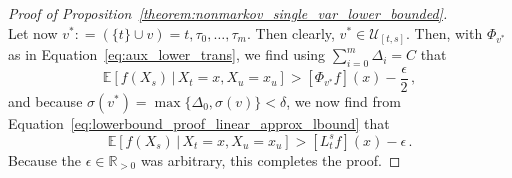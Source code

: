 \documentclass[10pt,a4paper]{paper}
\theoremstyle{definition}
\newcommand{\reals}{\mathbb{R}}
\newcommand{\realspos}{\reals_{>0}}
\newcommand{\coloneqq}{:\!=}
\begin{document}
\begin{proof}[Proof of Proposition~\ref{theorem:nonmarkov_single_var_lower_bounded}]
\begin{equation*}
\end{equation*}
Let now $v^*\coloneqq (\{t\}\cup v)=t,\tau_0,\ldots,\tau_m$. Then clearly, $v^*\in\mathcal{U}_{[t,s]}$. Then, with $\Phi_{v^*}$ as in Equation~\eqref{eq:aux_lower_trans}, we find using $\sum_{i=0}^m\Delta_i=C$ that
\begin{equation*}
\mathbb{E}[f(X_s)\,\vert\,X_t=x,X_u=x_u] > \left[\Phi_{v^*}f\right](x) - \frac{\epsilon}{2}\,,
\end{equation*}
and because $\sigma(v^*)=\max\{\Delta_0,\sigma(v)\}<\delta$, we now find from Equation~\eqref{eq:lowerbound_proof_linear_approx_lbound} that
\begin{equation*}
\mathbb{E}[f(X_s)\,\vert\,X_t=x,X_u=x_u] > \left[L_{t}^sf\right](x) - \epsilon\,.
\end{equation*}
Because the $\epsilon\in\realspos$ was arbitrary, this completes the proof.
\end{proof}
\end{document}
